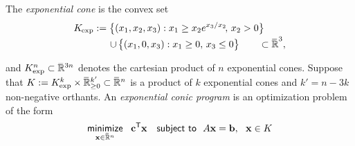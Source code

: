 \documentclass{article}
\newcommand\discard[1]{}
\newcommand\voli[1]{{\color{olicolor}\textbf{$\boldsymbol\{$Oli: }#1 \textbf{$\boldsymbol\}$}}}
\begin{document}
The \emph{exponential cone} is the convex set
\begin{align*}
        \begin{aligned}
        K_{\mskip-1mu\exp} :=
        \big\{ (x_1, x_2, x_3) &:
                x_1 \ge x_2 e^{x_3 / x_2}\!,\, x_2 > 0 \big\}
            \\[-0.4ex]\quad \mathbin{\cup}\,
        \big\{ (x_1, 0, x_3&) : x_1 \ge 0,\, x_3 \le 0 \big\}
        \qquad \subset \mathbb {\mskip1mu\overline{\mskip-1mu\mathbb R\!}\,}^3,
    \end{aligned}
\end{align*}
\discard{\voli{It is also sometimes called the ``relative entropy'' cone, because if $\mat m, \mat p \in \Delta^{n-1} \subset \mathbb R^n$ are points on a probability simplex, then $(-\mat u, \mat m, \mat p) \in K_{\exp}^n$ if and only if $\mat u$ is an upper bound on $\mat m \log (\nicefrac{\mat m}{\mat p})$, the pointwise contribution to relative entropy at each outcome.}}
%
and
$K_{\exp}^n \subset \smash{\mskip1mu\overline{\mskip-1mu\mathbb R\!}\,}\vphantom{R}^{3n}$ denotes the cartesian product
of $n$ exponential cones. 
Suppose that $K :=  K_{\exp}^k \times \mskip1mu\overline{\mskip-1mu\mathbb R\!}\,_{\ge 0}^{k'}
\subset \mskip1mu\overline{\mskip-1mu\mathbb R\!}\,^n$ is a product of $k$ exponential cones and $k' = n - 3k$ non-negative orthants.
An \emph{exponential conic program} is an optimization problem of the form
\begin{equation}
    \mathop{\text{\sf minimize}}
        \limits_{\mathbf{x} \in \mskip1mu\overline{\mskip-1mu\mathbb R\!}\,^{n}}
        ~~ \mathbf{c}^{\sf T} \mathbf{x}
    \quad\text{\sf subject to}~~ A \mathbf{x} = \mathbf{b},~~\mathbf{x} \in 
        K
        \label{eq:exp-conic-program}
\end{equation}
\end{document}
